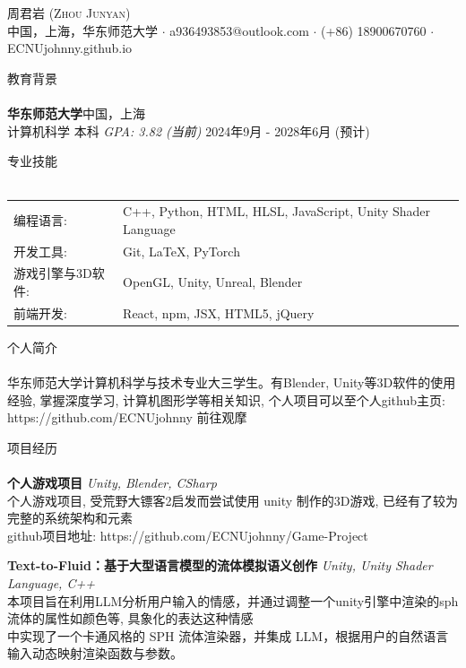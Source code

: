\documentclass[a4paper]{article}
\newcommand{\lineunder} {
    \vspace*{-8pt} \\
    \hspace*{-18pt} \hrulefill \\
}
\newcommand{\header} [1] {
    {\hspace*{-18pt}\vspace*{6pt} \textsc{#1}}
    \vspace*{-6pt} \lineunder
}
\begin{document}
\vspace*{-40pt}

\vspace*{-10pt}
\begin{center}
	{\Huge \scshape {周君岩 (Zhou Junyan)}}\\
	中国，上海，华东师范大学 $\cdot$ a936493853@outlook.com $\cdot$ (+86) 18900670760 $\cdot$ ECNUjohnny.github.io\\
\end{center}

\header{教育背景}
\textbf{华东师范大学}\hfill 中国，上海\\
计算机科学 本科 \textit{GPA: 3.82 (当前)} \hfill 2024年9月 - 2028年6月 (预计)\\
\vspace{3mm}

\header{专业技能}
\begin{tabular}{ l l }
	编程语言: & C++, Python, HTML, HLSL, JavaScript, Unity Shader Language \\
	开发工具: & Git, LaTeX, PyTorch \\
	游戏引擎与3D软件: & OpenGL, Unity, Unreal, Blender \\
    前端开发: & React, npm, JSX, HTML5, jQuery \\
\end{tabular}
\vspace{3mm}

\header{个人简介}
华东师范大学计算机科学与技术专业大三学生。有Blender, Unity等3D软件的使用经验, 掌握深度学习, 计算机图形学等相关知识, 个人项目可以至个人github主页: https://github.com/ECNUjohnny 前往观摩 \\
\vspace*{3mm}

\header{项目经历}
{\textbf{个人游戏项目}} {\sl Unity, Blender, CSharp} \\
个人游戏项目, 受荒野大镖客2启发而尝试使用 unity 制作的3D游戏, 已经有了较为完整的系统架构和元素 \\ 
github项目地址: https://github.com/ECNUjohnny/Game-Project \\
\vspace*{3mm}

{\textbf{Text-to-Fluid：基于大型语言模型的流体模拟语义创作}} {\sl Unity, Unity Shader Language, C++} \\
本项目旨在利用LLM分析用户输入的情感，并通过调整一个unity引擎中渲染的sph流体的属性如颜色等, 具象化的表达这种情感 \\ 中实现了一个卡通风格的 SPH 流体渲染器，并集成 LLM，根据用户的自然语言输入动态映射渲染函数与参数。\\
\vspace*{3mm}
\end{document}

